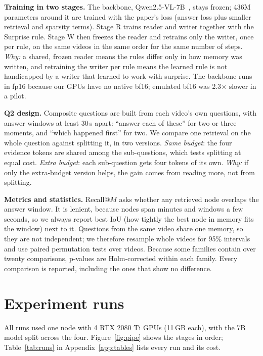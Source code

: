 \documentclass[11pt,a4paper]{article}
\newcommand{\why}[1]{\textit{Why:} #1}
\begin{document}
\textbf{Training in two stages.} The backbone, Qwen2.5-VL-7B~\cite{qwen25vl}, stays frozen; 436M parameters around it are
trained with the paper's loss (answer loss plus smaller retrieval and sparsity terms). Stage R trains reader and writer
together with the Surprise rule. Stage W then freezes the reader and retrains only the writer, once per rule, on the same
videos in the same order for the same number of steps. \why{a shared, frozen reader means the rules differ only in how
memory was written, and retraining the writer per rule means the learned rule is not handicapped by a writer that learned to
work with surprise.} The backbone runs in fp16 because our GPUs have no native bf16; emulated bf16 was 2.3$\times$ slower in
a pilot.

\textbf{Q2 design.} Composite questions are built from each video's own questions, with answer windows at least 30\,s
apart: ``answer each of these'' for two or three moments, and ``which happened first'' for two. We compare one retrieval on
the whole question against splitting it, in two versions. \emph{Same budget}: the four evidence tokens are shared among the
sub-questions, which tests splitting at equal cost. \emph{Extra budget}: each sub-question gets four tokens of its own.
\why{if only the extra-budget version helps, the gain comes from reading more, not from splitting.}

\textbf{Metrics and statistics.} Recall@$M$ asks whether any retrieved node overlaps the answer window. It is lenient,
because nodes span minutes and windows a few seconds, so we always report best IoU (how tightly the best node in memory fits
the window) next to it. Questions from the same video share one memory, so they are not independent; we therefore resample
whole videos for 95\% intervals and use paired permutation tests over videos. Because some families contain over twenty
comparisons, p-values are Holm-corrected within each family. Every comparison is reported, including the ones that show no
difference.

\section{Experiment runs}\label{sec:runs}

All runs used one node with 4 RTX 2080 Ti GPUs (11\,GB each), with the 7B model split across the four.
Figure~\ref{fig:pipe} shows the stages in order; Table~\ref{tab:runs} in Appendix~\ref{app:tables} lists every run and its
cost.
\end{document}
